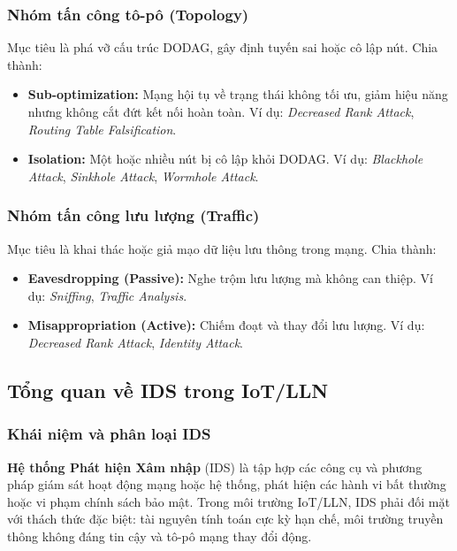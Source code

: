 \subsubsection{Nhóm tấn công tô-pô (Topology)}

Mục tiêu là phá vỡ cấu trúc DODAG, gây định tuyến sai hoặc cô lập nút.
Chia thành:

\begin{itemize}
    \item \textbf{Sub-optimization:} Mạng hội tụ về trạng thái không
          tối ưu, giảm hiệu năng nhưng không cắt đứt kết nối hoàn toàn.
          Ví dụ: \textit{Decreased Rank Attack}, \textit{Routing Table
          Falsification}.
    \item \textbf{Isolation:} Một hoặc nhiều nút bị cô lập khỏi DODAG.
          Ví dụ: \textit{Blackhole Attack}, \textit{Sinkhole Attack},
          \textit{Wormhole Attack}.
\end{itemize}

\subsubsection{Nhóm tấn công lưu lượng (Traffic)}

Mục tiêu là khai thác hoặc giả mạo dữ liệu lưu thông trong mạng. Chia
thành:

\begin{itemize}
    \item \textbf{Eavesdropping (Passive):} Nghe trộm lưu lượng mà không
          can thiệp. Ví dụ: \textit{Sniffing}, \textit{Traffic Analysis}.
    \item \textbf{Misappropriation (Active):} Chiếm đoạt và thay đổi
          lưu lượng. Ví dụ: \textit{Decreased Rank Attack},
          \textit{Identity Attack}.
\end{itemize}

\subsection{Tổng quan về IDS trong IoT/LLN}
\label{subsec:ids_overview}

\subsubsection{Khái niệm và phân loại IDS}

\textbf{Hệ thống Phát hiện Xâm nhập} (IDS) là tập hợp các công cụ và
phương pháp giám sát hoạt động mạng hoặc hệ thống, phát hiện các hành
vi bất thường hoặc vi phạm chính sách bảo mật. Trong môi trường
IoT/LLN, IDS phải đối mặt với thách thức đặc biệt: tài nguyên tính toán
cực kỳ hạn chế, môi trường truyền thông không đáng tin cậy và tô-pô mạng
thay đổi động.

